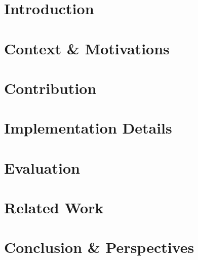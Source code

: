 	\newpage

	\afterpage{\blankpage}
	
	\tableofcontents
	
	\newpage
	
	\section{Introduction}
	\label{sec:intoduction}
	
	
	\section{Context \& Motivations}
	\label{sec:context_motivation}
	
	
	\section{Contribution}
	\label{sec:contribution}
	
	
	\section{Implementation Details}
	\label{sec:implementation_details}
	
	
	\section{Evaluation}
	\label{sec:evaluation}
	
	
	\section{Related Work}
	\label{sec:related_work}
	
	
	\section{Conclusion \& Perspectives}
	\label{sec:conclusion_perspectives}
	
	
	
	

